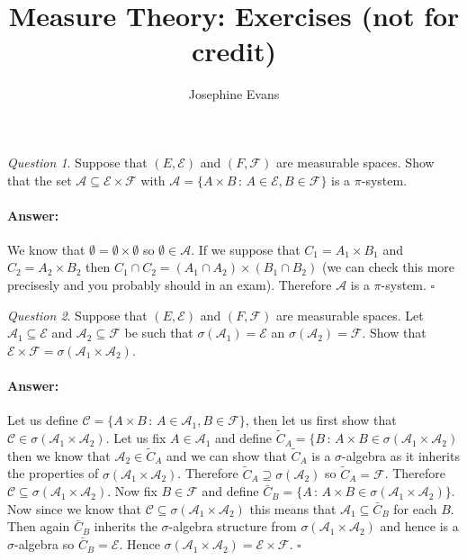 \documentclass[11pt]{article}
\author{
Josephine Evans
}
\title{Measure Theory: Exercises (not for credit)}
\theoremstyle{definition}
\theoremstyle{remark}
\newtheorem{q}{Question}
\newenvironment{ans}{\paragraph{Answer:}}{\hfill$\square$\vspace{10pt}}
\begin{document}
\maketitle

\begin{q}
Suppose that $(E, \mathcal{E})$ and $(F, \mathcal{F})$ are measurable spaces. Show that the set $\mathcal{A} \subseteq \mathcal{E} \times \mathcal{F}$ with $\mathcal{A} = \{ A \times B \,:\, A \in \mathcal{E}, B \in \mathcal{F}\}$ is a $\pi$-system. 
\end{q}
\begin{ans}
We know that $\emptyset = \emptyset \times \emptyset$ so $\emptyset \in \mathcal{A}$. If we suppose that $C_1 = A_1 \times B_1$ and $C_2 = A_2 \times B_2$ then $C_1 \cap C_2 = (A_1 \cap A_2) \times (B_1 \cap B_2)$ (we can check this more precisesly and you probably should in an exam). Therefore $\mathcal{A}$ is a $\pi$-system.
\end{ans}

\begin{q}
Suppose that $(E, \mathcal{E})$ and $(F, \mathcal{F})$ are measurable spaces. Let $\mathcal{A}_1 \subseteq \mathcal{E}$ and $\mathcal{A}_2 \subseteq \mathcal{F}$ be such that $\sigma(\mathcal{A}_1) = \mathcal{E}$ an $\sigma(\mathcal{A}_2) = \mathcal{F}$. Show that $\mathcal{E}\times \mathcal{F} = \sigma(\mathcal{A}_1 \times \mathcal{A}_2)$.
\end{q}
\begin{ans}
Let us define $\mathcal{C} = \{ A \times B \,:\, A \in \mathcal{A}_1, B \in \mathcal{F}\}$, then let us first show that $\mathcal{C} \in \sigma(\mathcal{A}_1 \times \mathcal{A}_2)$. Let us fix $A \in \mathcal{A}_1$ and define $\tilde{C}_A = \{ B \,:\, A \times B \in \sigma(\mathcal{A}_1 \times \mathcal{A}_2)$ then we know that $\mathcal{A}_2 \in \tilde{C}_A$ and we can show that $\tilde{C}_A$ is a $\sigma$-algebra as it inherits the properties of $\sigma(\mathcal{A}_1 \times \mathcal{A}_2)$. Therefore $\tilde{C}_A \supseteq \sigma(\mathcal{A}_2)$ so $\tilde{C}_A = \mathcal{F}$. Therefore $\mathcal{C} \subseteq   \sigma(\mathcal{A}_1 \times \mathcal{A}_2)$. Now fix $B \in \mathcal{F}$ and define $\bar{C}_B = \{ A \,:\, A \times B \in  \sigma(\mathcal{A}_1 \times \mathcal{A}_2)\}$. Now since we know that $\mathcal{C} \subseteq  \sigma(\mathcal{A}_1 \times \mathcal{A}_2)$ this means that $\mathcal{A}_1 \subseteq \bar{C}_B$ for each $B$. Then again $\bar{C}_B$ inherits the $\sigma$-algebra structure from  $\sigma(\mathcal{A}_1 \times \mathcal{A}_2)$ and hence is a $\sigma$-algebra so $\bar{C}_B = \mathcal{E}$. Hence $ \sigma(\mathcal{A}_1 \times \mathcal{A}_2) = \mathcal{E} \times \mathcal{F}$.
\end{ans}
\end{document}
